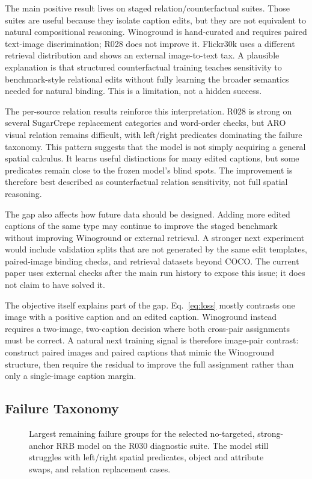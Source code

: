The main positive result lives on staged relation/counterfactual suites. Those suites are useful because they isolate caption edits, but they are not equivalent to natural compositional reasoning. Winoground is hand-curated and requires paired text-image discrimination; R028 does not improve it. Flickr30k uses a different retrieval distribution and shows an external image-to-text tax. A plausible explanation is that structured counterfactual training teaches sensitivity to benchmark-style relational edits without fully learning the broader semantics needed for natural binding. This is a limitation, not a hidden success.

The per-source relation results reinforce this interpretation. R028 is strong on several SugarCrepe replacement categories and word-order checks, but ARO visual relation remains difficult, with left/right predicates dominating the failure taxonomy. This pattern suggests that the model is not simply acquiring a general spatial calculus. It learns useful distinctions for many edited captions, but some predicates remain close to the frozen model's blind spots. The improvement is therefore best described as counterfactual relation sensitivity, not full spatial reasoning.

The gap also affects how future data should be designed. Adding more edited captions of the same type may continue to improve the staged benchmark without improving Winoground or external retrieval. A stronger next experiment would include validation splits that are not generated by the same edit templates, paired-image binding checks, and retrieval datasets beyond COCO. The current paper uses external checks after the main run history to expose this issue; it does not claim to have solved it.

The objective itself explains part of the gap. Eq.~\ref{eq:loss} mostly contrasts one image with a positive caption and an edited caption. Winoground instead requires a two-image, two-caption decision where both cross-pair assignments must be correct. A natural next training signal is therefore image-pair contrast: construct paired images and paired captions that mimic the Winoground structure, then require the residual to improve the full assignment rather than only a single-image caption margin.

\subsection{Failure Taxonomy}

\begin{figure}[t]
    \centering
    \resizebox{\columnwidth}{!}{}
    \caption{Largest remaining failure groups for the selected no-targeted, strong-anchor RRB model on the R030 diagnostic suite. The model still struggles with left/right spatial predicates, object and attribute swaps, and relation replacement cases.}
    \label{fig:failure_taxonomy}
\end{figure}

